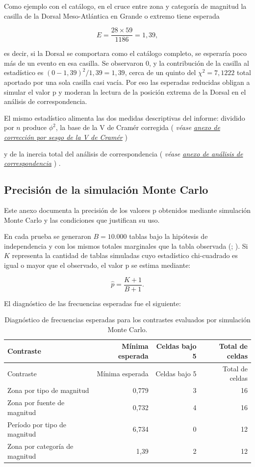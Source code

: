 \documentclass[
  spanish,
  letterpaper,
  DIV=11,
  numbers=noendperiod]{scrartcl}
\newcommand{\asesoriaParenRef}[1]{%
  \textnormal{\textcolor{asesoriaTextColor}{(}}%
  {\hypersetup{linkcolor=asesoriaLinkColor,urlcolor=asesoriaLinkColor,citecolor=asesoriaLinkColor}\textcolor{asesoriaTextColor}{\emph{#1}}}%
  \textnormal{\textcolor{asesoriaTextColor}{)}}%
}
\begin{document}
Como ejemplo con el catálogo, en el cruce entre zona y categoría de
magnitud la casilla de la Dorsal Meso-Atlántica en Grande o extremo
tiene esperada

\[
E=\frac{28\times 59}{1186}=1{,}39,
\]

es decir, si la Dorsal se comportara como el catálogo completo, se
esperaría poco más de un evento en esa casilla. Se observaron 0, y la
contribución de la casilla al estadístico es
\((0-1{,}39)^2/1{,}39=1{,}39\), cerca de un quinto del
\(\chi^2=7{,}1222\) total aportado por una sola casilla casi vacía. Por
eso las esperadas reducidas obligan a simular el valor p y moderan la
lectura de la posición extrema de la Dorsal en el análisis de
correspondencia.

El mismo estadístico alimenta las dos medidas descriptivas del informe:
dividido por \(n\) produce \(\phi^2\), la base de la V de Cramér
corregida
\asesoriaParenRef{véase \hyperref[sec-anexo-cramer]{anexo de corrección por sesgo de la V de Cramér}}
y de la inercia total del análisis de correspondencia
\asesoriaParenRef{véase \hyperref[sec-anexo-correspondencia]{anexo de análisis de correspondencia}}.

\subsection{Precisión de la simulación Monte
Carlo}\label{sec-anexo-montecarlo}

Este anexo documenta la precisión de los valores p obtenidos mediante
simulación Monte Carlo y las condiciones que justifican su uso.

En cada prueba se generaron \(B=10.000\) tablas bajo la hipótesis de
independencia y con los mismos totales marginales que la tabla observada
(;
). Si \(K\) representa la
cantidad de tablas simuladas cuyo estadístico chi-cuadrado es igual o
mayor que el observado, el valor p se estima mediante:

\[
\widehat p=\frac{K+1}{B+1}.
\]

El diagnóstico de las frecuencias esperadas fue el siguiente:

\begin{longtable}[]{@{}lrrr@{}}
\caption{Diagnóstico de frecuencias esperadas para los contrastes
evaluados por simulación Monte
Carlo.}\label{tbl-diagnostico-esperadas}\tabularnewline
\toprule\noalign{}
Contraste & Mínima esperada & Celdas bajo 5 & Total de celdas \\
\midrule\noalign{}
\endfirsthead
\toprule\noalign{}
Contraste & Mínima esperada & Celdas bajo 5 & Total de celdas \\
\midrule\noalign{}
\endhead
\bottomrule\noalign{}
\endlastfoot
Zona por tipo de magnitud & 0,779 & 3 & 16 \\
Zona por fuente de magnitud & 0,732 & 4 & 16 \\
Período por tipo de magnitud & 6,734 & 0 & 12 \\
Zona por categoría de magnitud & 1,39 & 2 & 12 \\
\end{longtable}
\end{document}
